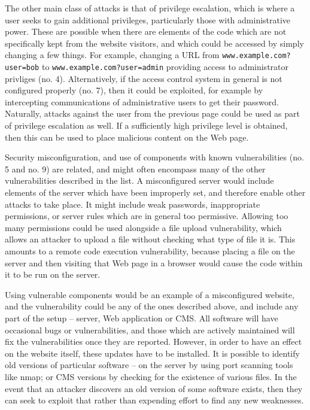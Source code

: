 \documentclass{acm_proc_article-sp}
\begin{document}
The other main class of attacks is that of privilege escalation, which is where a user seeks to gain additional privileges, particularly those with administrative power.  These are possible when there are elements of the code which are not specifically kept from the website visitors, and which could be accessed by simply changing a few things.  For example, changing a URL from \texttt{www.example.com?user=bob} to \texttt{www.example.com?user=admin} providing access to administrator privliges (no. 4).  Alternatively, if the access control system in general is not configured properly (no. 7), then it could be exploited, for example by intercepting communications of administrative users to get their password.  Naturally, attacks against the user from the previous page could be used as part of privilege escalation as well.  If a sufficiently high privilege level is obtained, then this can be used to place malicious content on the Web page.

Security misconfiguration, and use of components with known vulnerabilities (no. 5 and no. 9) are related, and might often encompass many of the other vulnerabilities described in the list.  A misconfigured server would include elements of the server which have been improperly set, and therefore enable other attacks to take place.  It might include weak passwords, inappropriate permissions, or server rules which are in general too permissive.  Allowing too many permissions could be used alongside a file upload vulnerability, which allows an attacker to upload a file without checking what type of file it is.  This amounts to a remote code execution vulnerability, because placing a file on the server and then visiting that Web page in a browser would cause the code within it to be run on the server.

Using vulnerable components would be an example of a misconfigured website, and the vulnerability could be any of the ones described above, and include any part of the setup -- server, Web application or CMS.  All software will have occasional bugs or vulnerabilities, and those which are actively maintained will fix the vulnerabilities once they are reported.  However, in order to have an effect on the website itself, these updates have to be installed.  It is possible to identify old versions of particular software -- on the server by using port scanning tools like nmap; or CMS versions by checking for the existence of various files.  In the event that an attacker discovers an old version of some software exists, then they can seek to exploit that rather than expending effort to find any new weaknesses.
\end{document}
